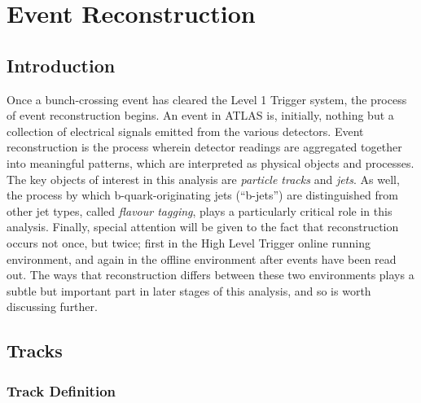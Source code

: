 \chapter{Event Reconstruction}



    \section{Introduction}
        Once a bunch-crossing event has cleared the Level 1 Trigger system, the process of event reconstruction begins.
        An event in ATLAS is, initially, nothing but a collection of electrical signals emitted from the various detectors.
        Event reconstruction is the process wherein detector readings are aggregated together into meaningful patterns,
            which are interpreted as physical objects and processes.
        The key objects of interest in this analysis are \textit{particle tracks} and \textit{jets}.
        As well, the process by which b-quark-originating jets (``b-jets'') are distinguished from other jet types,
            called \textit{flavour tagging}, plays a particularly critical role in this analysis.
        Finally, special attention will be given to the fact that reconstruction occurs not once, but twice;
            first in the High Level Trigger online running environment,
            and again in the offline environment after events have been read out.
        The ways that reconstruction differs between these two environments plays a subtle but important part
            in later stages of this analysis, and so is worth discussing further.


    \section{Tracks}
            
        \subsection{Track Definition}
            

